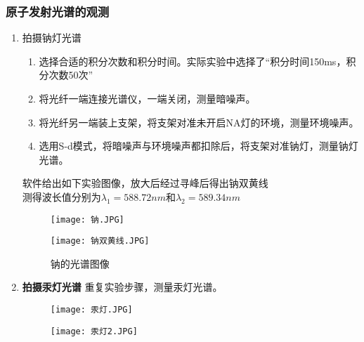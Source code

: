 \documentclass[dvipsnames, svgnames,a4paper,11pt]{article}
\begin{document}
	\subsubsection{原子发射光谱的观测}
	\begin{enumerate}
		\item 拍摄钠灯光谱
		\begin{enumerate}
			\item 选择合适的积分次数和积分时间。实际实验中选择了“积分时间150ms，积分次数50次”
			
			\item 将光纤一端连接光谱仪，一端关闭，测量暗噪声。 
			
			\item 将光纤另一端装上支架，将支架对准未开启NA灯的环境，测量环境噪声。
			
			\item 选用S-d模式，将暗噪声与环境噪声都扣除后，将支架对准钠灯，测量钠灯光谱。
			
		\end{enumerate}
        软件给出如下实验图像，放大后经过寻峰后得出钠双黄线\\
		测得波长值分别为$\lambda_1=588.72nm$和$\lambda_2=589.34nm$
		\begin{figure}[!htb]
			\centering
			\begin{minipage}{0.35\textwidth}
				\centering
				\texttt{[image: 钠.JPG]}
				
				\label{fig:sodium_spectrum}
			\end{minipage}%
			\hspace{0.1\textwidth}
			\begin{minipage}{0.35\textwidth}
				\centering
				\texttt{[image: 钠双黄线.JPG]}
				
				\label{fig:sodium_double_yellow_lines}
			\end{minipage}
			\caption{钠的光谱图像}
			\label{fig:sodium_spectra}
		\end{figure}
		\item \textbf{拍摄汞灯光谱}
		重复实验步骤，测量汞灯光谱。
		\begin{figure}[H]
			\centering
			\begin{minipage}{0.35\textwidth}
				\centering
				\texttt{[image: 汞灯.JPG]}
			
				\label{fig:mercury_lamp1}
			\end{minipage}%
			\hspace{0.1\textwidth}
			\begin{minipage}{0.35\textwidth}
				\centering
				\texttt{[image: 汞灯2.JPG]}
				

\end{minipage}
\end{figure}
\end{enumerate}
\end{document}
